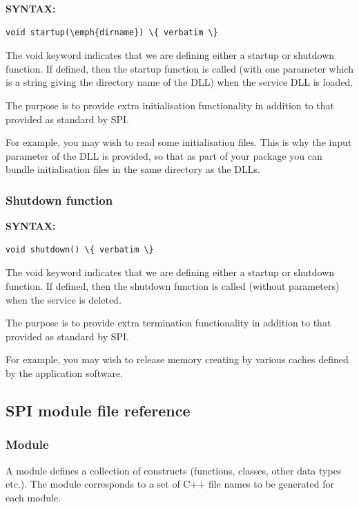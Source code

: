 \textbf{SYNTAX:}
\nopagebreak
\begin{Verbatim}[commandchars=\\\{\}]
    void startup(\emph{dirname}) \{ verbatim \}
\end{Verbatim}

The void keyword indicates that we are defining either a startup or shutdown function.
If defined, then the startup function is called (with one parameter which is a string giving the directory name of the DLL) when the service DLL is loaded.

The purpose is to provide extra initialisation functionality in addition to that provided as standard by SPI.

For example, you may wish to read some initialisation files.
This is why the input parameter of the DLL is provided, so that as part of your package you can bundle initialisation files in the same directory as the DLLs.


\subsubsection{Shutdown function} \label{shutdown}

\textbf{SYNTAX:}
\nopagebreak
\begin{Verbatim}[commandchars=\\\{\}]
    void shutdown() \{ verbatim \}
\end{Verbatim}

The void keyword indicates that we are defining either a startup or shutdown function.
If defined, then the shutdown function is called (without parameters) when the service is deleted.

The purpose is to provide extra termination functionality in addition to that provided as standard by SPI.

For example, you may wish to release memory creating by various caches defined by the application software.


\newpage
\subsection{SPI module file reference}

\subsubsection{Module} \label{module}

A module defines a collection of constructs (functions, classes, other data types etc.). The module corresponds to a set of C++ file names to be generated for each module.


